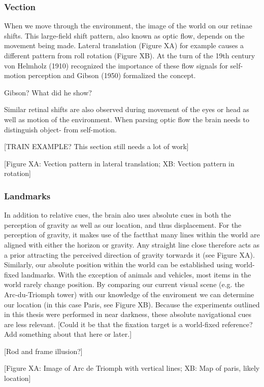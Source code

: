 \subsubsection{Vection}
When we move through the environment, the image of the world on our retinae shifts. This large-field shift pattern, also known as optic flow, depends on the movement being made. Lateral translation (Figure XA) for example causes a different pattern from roll rotation (Figure XB). At the turn of the 19th century von Helmholz (1910) recognized the importance of these flow signals for self-motion perception and Gibson (1950) formalized the concept.

Gibson? What did he show?

Similar retinal shifts are also observed during movement of the eyes or head as well as motion of the environment. When parsing optic flow the brain needs to distinguish object- from self-motion. 

[TRAIN EXAMPLE? This section still needs a lot of work]

[Figure XA: Vection pattern in lateral translation; XB: Vection pattern in rotation]

\subsubsection{Landmarks}
In addition to relative cues, the brain also uses absolute cues in both the perception of gravity as well as our location, and thus displacement. For the perception of gravity, it makes use of the factthat many lines within the world are aligned with either the horizon or gravity. Any straight line close therefore acts as a prior attracting the perceived direction of gravity torwards it (see Figure XA). Similarly, our absolute position within the world can be established using world-fixed landmarks. With the exception of animals and vehicles, most items in the world rarely change position. By comparing our current visual scene (e.g. the Arc-du-Triomph tower) with our knowledge of the enviroment we can determine our location (in this case Paris, see Figure XB). Because the experiments outlined in this thesis were performed in near darkness, these absolute  navigational cues are less relevant. [Could it be that the fixation target is a world-fixed reference? Add something about that here or later.]

[Rod and frame illusion?]

[Figure XA: Image of Arc de Triomph with vertical lines; XB: Map of paris, likely location]

